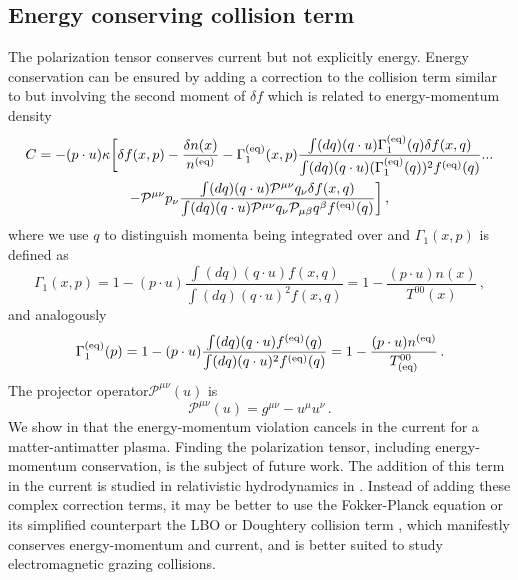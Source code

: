 \subsection{Energy conserving collision term}
The polarization tensor  conserves current but not explicitly energy. Energy conservation can be ensured by adding a correction to the collision term similar to  but involving the second moment of $\delta f$ which is related to energy-momentum density \cite{Rocha:2021zcw}
\begin{multline}
    C = - (p\cdot u) \kappa\bigg[\delta f(x,p) -\frac{\delta n(x) }{ n^{(\mathrm{eq})} } -\Gamma_1^{(\mathrm{eq})}(x,p)\frac{\int (dq) (q\cdot u)\Gamma_1^{(\mathrm{eq})}(q) \delta f(x,q) }{\int (dq) (q\cdot u) (\Gamma_1^{(\mathrm{eq})}(q))^2 f^{(\mathrm{eq})}(q) }...\\
    -\mathcal{P}^{\mu \nu}p_\nu\frac{\int (dq) (q\cdot u)\mathcal{P}^{\mu \nu}q_\nu \delta f(x,q) }{\int (dq) (q\cdot u) \mathcal{P}^{\mu \nu}q_\nu\mathcal{P}_{\mu \beta}q^\beta f^{(\mathrm{eq})}(q) }
    \bigg]\,,
\end{multline}
where we use $q$ to distinguish momenta being integrated over and $\Gamma_1(x,p)$ is defined as
\begin{equation}
    \Gamma_1(x,p) = 1-(p\cdot u)\frac{\int (dq) (q\cdot u)f(x,q)}{\int (dq) (q\cdot u)^2f(x,q)}
    = 1-\frac{ (p\cdot u) n(x)}{T^{00}(x)}\,,
\end{equation}
and analogously
\begin{equation}
    \Gamma_1^{(\mathrm{eq})}(p) = 1-(p\cdot u)\frac{\int (dq) (q\cdot u)f^{(\mathrm{eq})}(q)}{\int (dq) (q\cdot u)^2f^{(\mathrm{eq})}(q)}
    = 1-\frac{ (p\cdot u) n^{(\mathrm{eq})}}{T_{(\text{eq})}^{00}} \,.
\end{equation}
The projector operator$\mathcal{P}^{\mu \nu}(u)$ is 
\begin{equation}
    \mathcal{P}^{\mu \nu}(u) = g^{\mu \nu} -u^\mu u^\nu\,.
\end{equation}
We show in \cite{Grayson:2022asf} that the energy-momentum violation cancels in the current for a matter-antimatter plasma. Finding the polarization tensor, including energy-momentum conservation, is the subject of future work. The addition of this term in the current is studied in relativistic hydrodynamics in \cite{Singha:2023eia}. Instead of adding these complex correction terms, it may be better to use the Fokker-Planck equation or its simplified counterpart the LBO or Doughtery collision term \cite{Dougherty1964,Francisquez_Juno_Hakim_Hammett_Ernst_2022,Ong_Yu_1970}, which manifestly conserves energy-momentum and current, and is better suited to study electromagnetic grazing collisions. 
